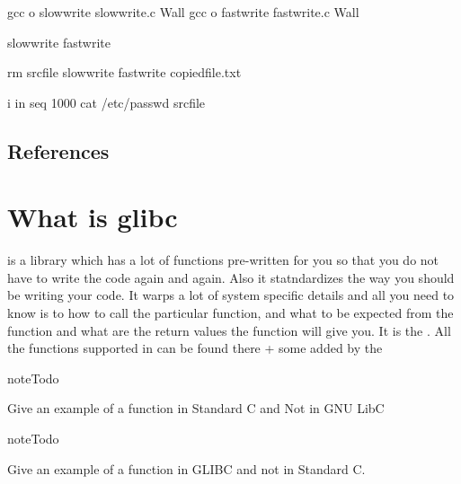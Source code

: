 \documentclass[letterpaper,10pt,english]{sphinxmanual}
\begin{document}
\begin{sphinxVerbatim}[commandchars=\\\{\},numbers=left,firstnumber=1,stepnumber=1]
	gcc \PYGZhy{}o slow\PYGZus{}write slow\PYGZus{}write.c \PYGZhy{}Wall
	gcc \PYGZhy{}o fast\PYGZus{}write fast\PYGZus{}write.c \PYGZhy{}Wall

	 slow\PYGZus{}write
	 fast\PYGZus{}write

	rm src\PYGZus{}file slow\PYGZus{}write fast\PYGZus{}write copied\PYGZus{}file.txt

	 i in seq  1000  cat /etc/passwd \PYGZgt{}\PYGZgt{} src\PYGZus{}file  
\end{sphinxVerbatim}


\section{References}
\label{\detokenize{02_system_calls:references}}

\chapter{What is glibc}
\label{\detokenize{03_glibc::doc}}\label{\detokenize{03_glibc:what-is-glibc}}
 is a library which has a lot of functions pre-written for you so that
you do not have to write the code again and again. Also it statndardizes the
way you should be writing your code. It warps a lot of system specific details
and all you need to know is to how to call the particular function, and what to
be expected from the function and what are the return values the function will
give you. It is the . All the functions
supported in  can be found there + some added by the

\begin{sphinxadmonition}{note}{Todo}

Give an example of a function in Standard C and Not in GNU LibC
\end{sphinxadmonition}

\begin{sphinxadmonition}{note}{Todo}

Give an example of a function in GLIBC and not in Standard C.
\end{sphinxadmonition}
\end{document}
